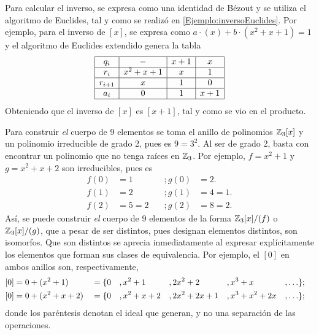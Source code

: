 \begin{Revision}
\begin{ejs}
        Para calcular el inverso, se expresa como una identidad de Bézout y se utiliza el algoritmo de Euclides, tal y como se realizó en \ref{Ejemplo:inversoEuclides}. Por ejemplo, para el inverso de $[x]$, se expresa como $a\cdot(x) + b\cdot(x^2+x+1) = 1$ y el algoritmo de Euclides extendido genera la tabla
         \[
                \begin{array}{|c|c|c|c|}
                    \hline
                    q_i     &  -          & x + 1     & x \\
                    \hline
                    r_i    &  x^2 + x + 1 & x & 1  \\
                    \hline
                    r_{i+1} &  x & 1           &  0        \\
                    \hline
                    a_i     &0            &  1          &  x + 1       \\
                    \hline
                \end{array}
        \]        
        Obteniendo que el inverso de $[x]$ es $[x+1]$, tal y como se vio en el producto.

        
        \item Para construir \textit{el} cuerpo de 9 elementos se toma el anillo de polinomios $\mathbb{Z}_3[x]$ y un polinomio irreducible de grado 2, pues es $9 = 3^2$. Al ser de grado 2, basta con encontrar un polinomio que no tenga raíces en $\mathbb{Z}_3$. Por ejemplo, $f = x^2 + 1$ y $g = x^2 + x + 2$ son irreducibles, pues es
        \begin{equation*}
            \begin{aligned}
                f(0) &= 1 \quad     &; g(0) &= 2.\\
                f(1) &= 2 \quad     &; g(1) &= 4 = 1.\\
                f(2) &= 5 =2 \quad  &; g(2) &= 8 = 2.
            \end{aligned}
        \end{equation*}
        Así, se puede construir \textit{el} cuerpo de 9 elementos de la forma $\mathbb{Z}_3[x]/(f)$ o $\mathbb{Z}_3[x]/(g)$, que a pesar de ser distintos, pues designan elementos distintos, son isomorfos. Que son distintos se aprecia inmediatamente al expresar explícitamente los elementos que forman sus clases de equivalencia. Por ejemplo, el $[0]$ en ambos anillos son, respectivamente,
            \begin{equation*}
                \begin{aligned}\relax 
                    [0] &= 0 + (x^2 + 1) &&= \{0&&,x^2 + 1&&, 2x^2 + 2&&, x^3 + x&&, \ldots \};&&\\
                    [0] &= 0 + (x^2 + x +  2)&&= \{0&&,x^2 + x +  2&&, 2x^2 + 2x + 1&&, x^3 + x^2 + 2x&&, \ldots\};&&
                \end{aligned}
            \end{equation*}
        donde los paréntesis denotan el ideal que generan, y no una separación de las operaciones.
    

\end{ejs}
\end{Revision}
